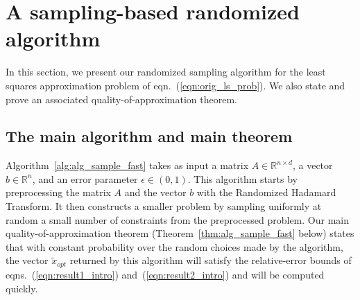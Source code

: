\documentclass[11pt]{article}
\begin{document}
\section{A sampling-based randomized algorithm} \label{sxn:sampling}

In this section, we present our randomized sampling algorithm for the least squares approximation problem of eqn.~(\ref{eqn:orig_ls_prob}). We also state and prove an associated quality-of-approximation theorem.

\subsection{The main algorithm and main theorem} \label{sxn:sampling:result}

Algorithm~\ref{alg:alg_sample_fast} takes as input a matrix $A \in \mathbb{R}^{n \times d}$, a vector $b \in \mathbb{R}^n$, and an error parameter $\epsilon \in (0,1)$. This algorithm starts by preprocessing the matrix $A$ and the vector $b$ with the Randomized Hadamard Transform. It then constructs a smaller problem by sampling uniformly at random a small number of constraints from the preprocessed problem. Our main quality-of-approximation theorem (Theorem~\ref{thm:alg_sample_fast} below) states that with constant probability over the random choices made by the algorithm, the vector
$\tilde{x}_{opt}$ returned by this algorithm will satisfy the relative-error bounds of eqns.~(\ref{eqn:result1_intro}) and~(\ref{eqn:result2_intro}) and will be computed quickly.
\end{document}
